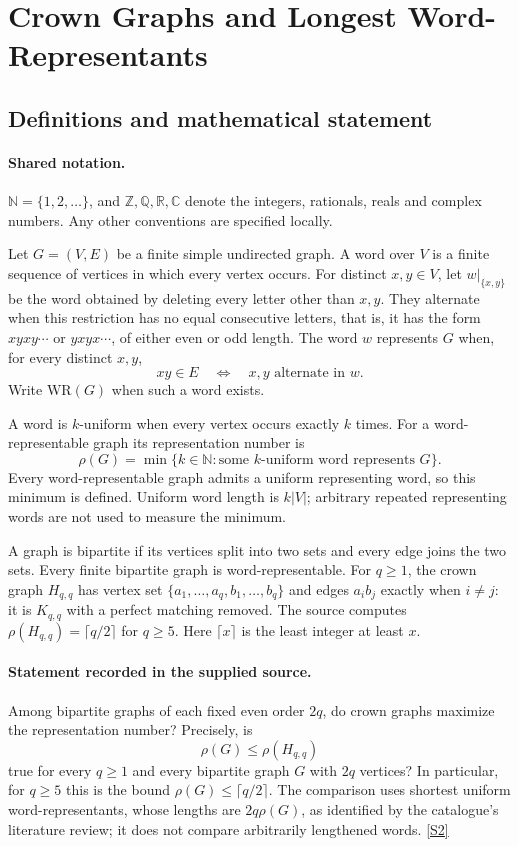 \documentclass[11pt]{article}
\newcommand{\sref}[2]{\hyperlink{source:#1:#2}{[S#2]}}
\begin{document}
\section{Crown Graphs and Longest Word-Representants}\label{statement}

\subsection{Definitions and mathematical statement}

\paragraph{Shared notation.}$\mathbb N=\{1,2,\ldots\}$, and $\mathbb Z,\mathbb Q,\mathbb R,\mathbb C$ denote the integers, rationals, reals and complex numbers. Any other conventions are specified locally.


Let $G=(V,E)$ be a finite simple undirected graph. A word over $V$ is a finite sequence of vertices in which every vertex occurs. For distinct $x,y\in V$, let $w|_{\{x,y\}}$ be the word obtained by deleting every letter other than $x,y$. They alternate when this restriction has no equal consecutive letters, that is, it has the form $xyxy\cdots$ or $yxyx\cdots$, of either even or odd length. The word $w$ represents $G$ when, for every distinct $x,y$,
\[
 xy\in E\quad\Longleftrightarrow\quad x,y\text{ alternate in }w.
\]
Write $\mathrm{WR}(G)$ when such a word exists.

A word is $k$-uniform when every vertex occurs exactly $k$ times. For a word-representable graph its representation number is
\[
 \rho(G)=\min\{k\in\mathbb N:\text{some }k\text{-uniform word represents }G\}.
\]
Every word-representable graph admits a uniform representing word, so this minimum is defined. Uniform word length is $k|V|$; arbitrary repeated representing words are not used to measure the minimum.

A graph is bipartite if its vertices split into two sets and every edge joins the two sets. Every finite bipartite graph is word-representable. For $q\ge1$, the crown graph $H_{q,q}$ has vertex set $\{a_1,\ldots,a_q,b_1,\ldots,b_q\}$ and edges $a_ib_j$ exactly when $i\ne j$: it is $K_{q,q}$ with a perfect matching removed. The source computes $\rho(H_{q,q})=\lceil q/2\rceil$ for $q\ge5$. Here $\lceil x\rceil$ is the least integer at least $x$.
\paragraph{Statement recorded in the supplied source.}
Among bipartite graphs of each fixed even order $2q$, do crown graphs maximize the representation number? Precisely, is
\[
 \rho(G)\le\rho(H_{q,q})
\]
true for every $q\ge1$ and every bipartite graph $G$ with $2q$ vertices? In particular, for $q\ge5$ this is the bound $\rho(G)\le\lceil q/2\rceil$. The comparison uses shortest uniform word-representants, whose lengths are $2q\rho(G)$, as identified by the catalogue's literature review; it does not compare arbitrarily lengthened words. \sref{statement}{2}
\end{document}

